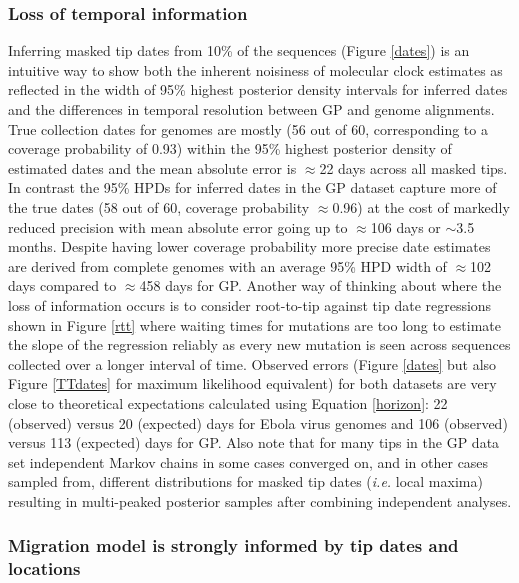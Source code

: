 \documentclass{bmcart}
\begin{document}
\subsubsection*{Loss of temporal information}


Inferring masked tip dates from 10\% of the sequences (Figure \ref{dates}) is an intuitive way to show both the inherent noisiness of molecular clock estimates as reflected in the width of 95\% highest posterior density intervals for inferred dates and the differences in temporal resolution between GP and genome alignments.
True collection dates for genomes are mostly (56 out of 60, corresponding to a coverage probability of 0.93) within the 95\% highest posterior density of estimated dates and the mean absolute error is $\approx$22 days across all masked tips.
In contrast the 95\% HPDs for inferred dates in the GP dataset capture more of the true dates (58 out of 60, coverage probability $\approx$0.96) at the cost of markedly reduced precision with mean absolute error going up to $\approx$106 days or $\sim$3.5 months.
Despite having lower coverage probability more precise date estimates are derived from complete genomes with an average 95\% HPD width of $\approx$102 days compared to $\approx$458 days for GP.
Another way of thinking about where the loss of information occurs is to consider root-to-tip against tip date regressions shown in Figure \ref{rtt} where waiting times for mutations are too long to estimate the slope of the regression reliably as every new mutation is seen across sequences collected over a longer interval of time.
Observed errors (Figure \ref{dates} but also Figure \ref{TTdates} for maximum likelihood equivalent) for both datasets are very close to theoretical expectations calculated using Equation \ref{horizon}: 22 (observed) versus 20 (expected) days for Ebola virus genomes and 106 (observed) versus 113 (expected) days for GP.
Also note that for many tips in the GP data set independent Markov chains in some cases converged on, and in other cases sampled from, different distributions for masked tip dates (\textit{i.e.} local maxima) resulting in multi-peaked posterior samples after combining independent analyses.




\subsubsection*{Migration model is strongly informed by tip dates and locations}
\end{document}
